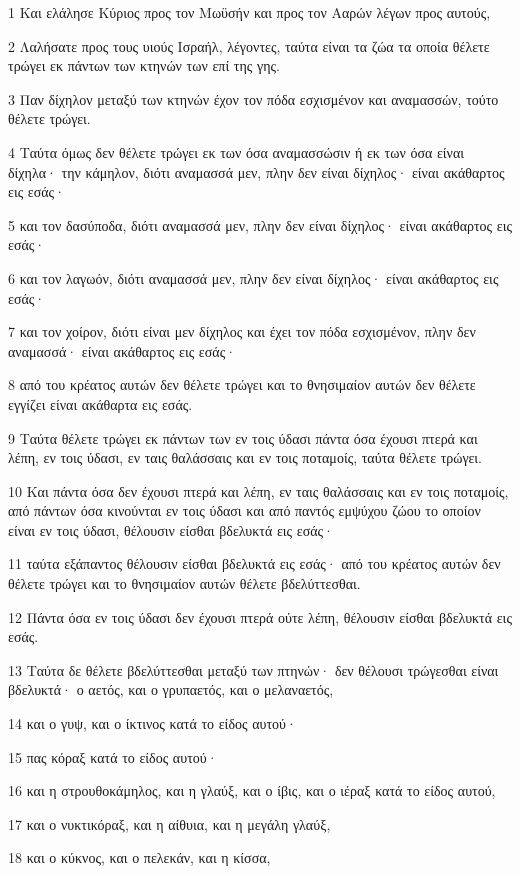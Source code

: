 \par 1 Και ελάλησε Κύριος προς τον Μωϋσήν και προς τον Ααρών λέγων προς αυτούς,
\par 2 Λαλήσατε προς τους υιούς Ισραήλ, λέγοντες, ταύτα είναι τα ζώα τα οποία θέλετε τρώγει εκ πάντων των κτηνών των επί της γης.
\par 3 Παν δίχηλον μεταξύ των κτηνών έχον τον πόδα εσχισμένον και αναμασσών, τούτο θέλετε τρώγει.
\par 4 Ταύτα όμως δεν θέλετε τρώγει εκ των όσα αναμασσώσιν ή εκ των όσα είναι δίχηλα· την κάμηλον, διότι αναμασσά μεν, πλην δεν είναι δίχηλος· είναι ακάθαρτος εις εσάς·
\par 5 και τον δασύποδα, διότι αναμασσά μεν, πλην δεν είναι δίχηλος· είναι ακάθαρτος εις εσάς·
\par 6 και τον λαγωόν, διότι αναμασσά μεν, πλην δεν είναι δίχηλος· είναι ακάθαρτος εις εσάς·
\par 7 και τον χοίρον, διότι είναι μεν δίχηλος και έχει τον πόδα εσχισμένον, πλην δεν αναμασσά· είναι ακάθαρτος εις εσάς·
\par 8 από του κρέατος αυτών δεν θέλετε τρώγει και το θνησιμαίον αυτών δεν θέλετε εγγίζει είναι ακάθαρτα εις εσάς.
\par 9 Ταύτα θέλετε τρώγει εκ πάντων των εν τοις ύδασι πάντα όσα έχουσι πτερά και λέπη, εν τοις ύδασι, εν ταις θαλάσσαις και εν τοις ποταμοίς, ταύτα θέλετε τρώγει.
\par 10 Και πάντα όσα δεν έχουσι πτερά και λέπη, εν ταις θαλάσσαις και εν τοις ποταμοίς, από πάντων όσα κινούνται εν τοις ύδασι και από παντός εμψύχου ζώου το οποίον είναι εν τοις ύδασι, θέλουσιν είσθαι βδελυκτά εις εσάς·
\par 11 ταύτα εξάπαντος θέλουσιν είσθαι βδελυκτά εις εσάς· από του κρέατος αυτών δεν θέλετε τρώγει και το θνησιμαίον αυτών θέλετε βδελύττεσθαι.
\par 12 Πάντα όσα εν τοις ύδασι δεν έχουσι πτερά ούτε λέπη, θέλουσιν είσθαι βδελυκτά εις εσάς.
\par 13 Ταύτα δε θέλετε βδελύττεσθαι μεταξύ των πτηνών· δεν θέλουσι τρώγεσθαι είναι βδελυκτά· ο αετός, και ο γρυπαετός, και ο μελαναετός,
\par 14 και ο γυψ, και ο ίκτινος κατά το είδος αυτού·
\par 15 πας κόραξ κατά το είδος αυτού·
\par 16 και η στρουθοκάμηλος, και η γλαύξ, και ο ίβις, και ο ιέραξ κατά το είδος αυτού,
\par 17 και ο νυκτικόραξ, και η αίθυια, και η μεγάλη γλαύξ,
\par 18 και ο κύκνος, και ο πελεκάν, και η κίσσα,
